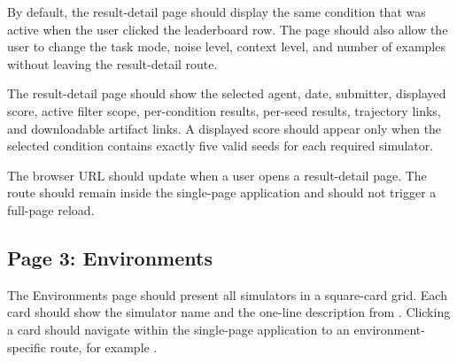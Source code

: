 \documentclass[11pt]{article}
\begin{document}
By default, the result-detail page should display the same condition that was active when the user clicked the leaderboard row.
The page should also allow the user to change the task mode, noise level, context level, and number of examples without leaving the result-detail route.

The result-detail page should show the selected agent, date, submitter, displayed score, active filter scope, per-condition results, per-seed results, trajectory links, and downloadable artifact links. 
A displayed score should appear only when the selected condition contains exactly five valid seeds for each required simulator.


The browser URL should update when a user opens a result-detail page.
The route should remain inside the single-page application and should not trigger a full-page reload.


\label{sec:website-page-environments}

\subsection*{Page 3: Environments}
The Environments page should present all simulators in a square-card grid. 
Each card should show the simulator name and the one-line description from . 
Clicking a card should navigate within the single-page application to an environment-specific route, for example .

\label{sec:website-environment-specific-page}
\end{document}
